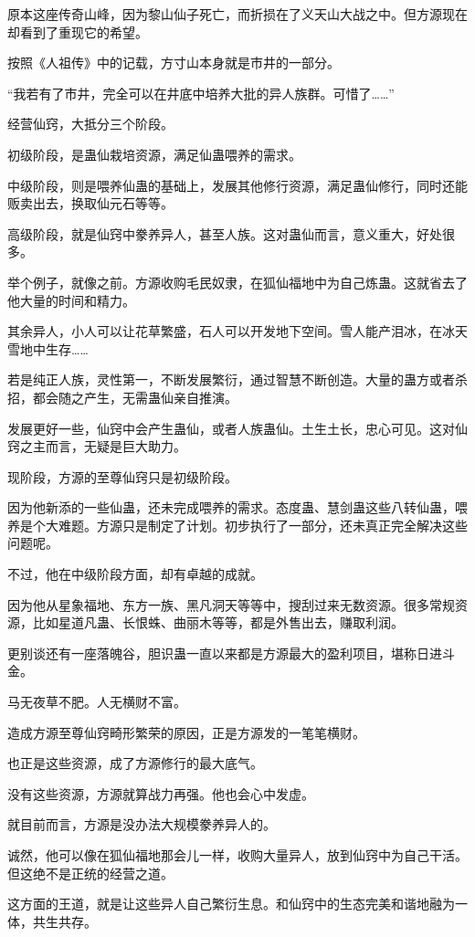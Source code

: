 \begin{this_body}
原本这座传奇山峰，因为黎山仙子死亡，而折损在了义天山大战之中。但方源现在却看到了重现它的希望。

按照《人祖传》中的记载，方寸山本身就是市井的一部分。

“我若有了市井，完全可以在井底中培养大批的异人族群。可惜了……”

经营仙窍，大抵分三个阶段。

初级阶段，是蛊仙栽培资源，满足仙蛊喂养的需求。

中级阶段，则是喂养仙蛊的基础上，发展其他修行资源，满足蛊仙修行，同时还能贩卖出去，换取仙元石等等。

高级阶段，就是仙窍中豢养异人，甚至人族。这对蛊仙而言，意义重大，好处很多。

举个例子，就像之前。方源收购毛民奴隶，在狐仙福地中为自己炼蛊。这就省去了他大量的时间和精力。

其余异人，小人可以让花草繁盛，石人可以开发地下空间。雪人能产泪冰，在冰天雪地中生存……

若是纯正人族，灵性第一，不断发展繁衍，通过智慧不断创造。大量的蛊方或者杀招，都会随之产生，无需蛊仙亲自推演。

发展更好一些，仙窍中会产生蛊仙，或者人族蛊仙。土生土长，忠心可见。这对仙窍之主而言，无疑是巨大助力。

现阶段，方源的至尊仙窍只是初级阶段。

因为他新添的一些仙蛊，还未完成喂养的需求。态度蛊、慧剑蛊这些八转仙蛊，喂养是个大难题。方源只是制定了计划。初步执行了一部分，还未真正完全解决这些问题呢。

不过，他在中级阶段方面，却有卓越的成就。

因为他从星象福地、东方一族、黑凡洞天等等中，搜刮过来无数资源。很多常规资源，比如星道凡蛊、长恨蛛、曲丽木等等，都是外售出去，赚取利润。

更别谈还有一座落魄谷，胆识蛊一直以来都是方源最大的盈利项目，堪称日进斗金。

马无夜草不肥。人无横财不富。

造成方源至尊仙窍畸形繁荣的原因，正是方源发的一笔笔横财。

也正是这些资源，成了方源修行的最大底气。

没有这些资源，方源就算战力再强。他也会心中发虚。

就目前而言，方源是没办法大规模豢养异人的。

诚然，他可以像在狐仙福地那会儿一样，收购大量异人，放到仙窍中为自己干活。但这绝不是正统的经营之道。

这方面的王道，就是让这些异人自己繁衍生息。和仙窍中的生态完美和谐地融为一体，共生共存。


\end{this_body}
